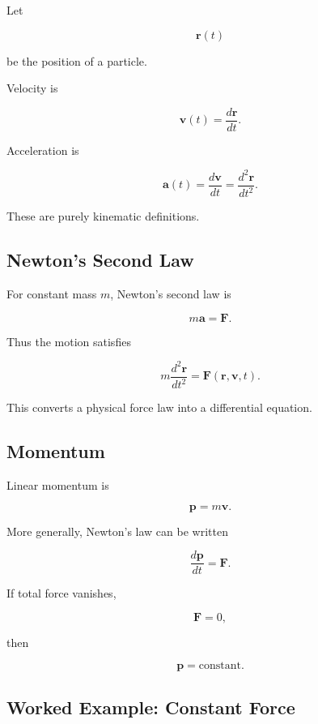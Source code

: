 Let

\[
\mathbf{r}(t)
\]

be the position of a particle.

Velocity is

\[
\boxed{
\mathbf{v}(t)
=
\frac{d\mathbf{r}}{dt}.
}
\]

Acceleration is

\[
\boxed{
\mathbf{a}(t)
=
\frac{d\mathbf{v}}{dt}
=
\frac{d^2\mathbf{r}}{dt^2}.
}
\]

These are purely kinematic definitions.

\subsection{Newton's Second Law}
\label{subsec:newtons-second-law}

For constant mass \(m\), Newton's second law is

\[
\boxed{
m\mathbf{a}
=
\mathbf{F}.
}
\]

Thus the motion satisfies

\[
\boxed{
m\frac{d^2\mathbf{r}}{dt^2}
=
\mathbf{F}
\left(
\mathbf{r},
\mathbf{v},
t
\right).
}
\]

This converts a physical force law into a differential equation.

\subsection{Momentum}
\label{subsec:classical-momentum}

Linear momentum is

\[
\boxed{
\mathbf{p}
=
m\mathbf{v}.
}
\]

More generally, Newton's law can be written

\[
\boxed{
\frac{d\mathbf{p}}{dt}
=
\mathbf{F}.
}
\]

If total force vanishes,

\[
\mathbf{F}=0,
\]

then

\[
\boxed{
\mathbf{p}
=
\text{constant}.
}
\]

\subsection{Worked Example: Constant Force}
\label{subsec:worked-constant-force}

